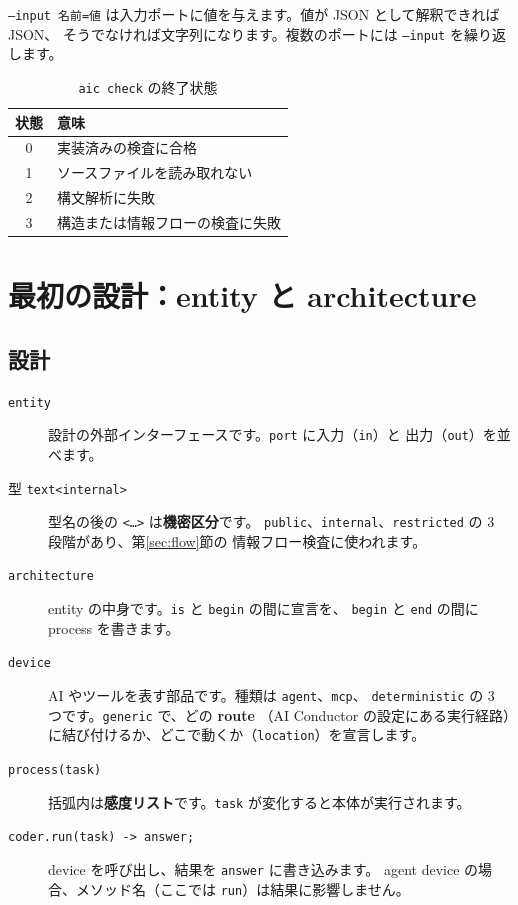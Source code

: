\documentclass[a4paper,11pt]{ltjsarticle}
\newcommand{\ex}[1]{\texttt{examples/tutorial/#1}}
\begin{document}
\texttt{--input 名前=値} は入力ポートに値を与えます。値が JSON として解釈できれば JSON、
そうでなければ文字列になります。複数のポートには \texttt{--input} を繰り返します。

\begin{table}[h]
\centering
\caption{\texttt{aic check} の終了状態}
\begin{tabular}{cl}
\toprule
状態 & 意味 \\
\midrule
0 & 実装済みの検査に合格 \\
1 & ソースファイルを読み取れない \\
2 & 構文解析に失敗 \\
3 & 構造または情報フローの検査に失敗 \\
\bottomrule
\end{tabular}
\end{table}

\section{最初の設計：entity と architecture}

\subsection{設計}



\begin{description}
  \item[\texttt{entity}] 設計の外部インターフェースです。\texttt{port} に入力（\texttt{in}）と
    出力（\texttt{out}）を並べます。
  \item[型 \texttt{text<internal>}] 型名の後の \texttt{<\dots>} は\textbf{機密区分}です。
    \texttt{public}、\texttt{internal}、\texttt{restricted} の 3 段階があり、第\ref{sec:flow}節の
    情報フロー検査に使われます。
  \item[\texttt{architecture}] entity の中身です。\texttt{is} と \texttt{begin} の間に宣言を、
    \texttt{begin} と \texttt{end} の間に process を書きます。
  \item[\texttt{device}] AI やツールを表す部品です。種類は \texttt{agent}、\texttt{mcp}、
    \texttt{deterministic} の 3 つです。\texttt{generic} で、どの \textbf{route}
    （AI Conductor の設定にある実行経路）に結び付けるか、どこで動くか（\texttt{location}）を宣言します。
  \item[\texttt{process(task)}] 括弧内は\textbf{感度リスト}です。\texttt{task} が変化すると本体が実行されます。
  \item[\texttt{coder.run(task) -> answer;}] device を呼び出し、結果を \texttt{answer} に書き込みます。
    agent device の場合、メソッド名（ここでは \texttt{run}）は結果に影響しません。
\end{description}
\end{document}
